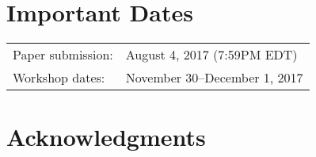 \documentclass{hotnets17}
\begin{document}
\section{Important Dates}

{
\small 
\begin{tabular}{ll}
Paper submission: 	        & August 4, 2017 (7:59PM EDT)\\
Workshop dates: 	        & November 30--December 1, 2017\\
\end{tabular}
}

\section*{Acknowledgments}

 
\begin{small}

\end{small}
\end{document}
